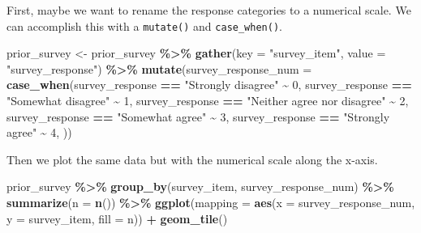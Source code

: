 \documentclass[
]{book}
\newenvironment{Shaded}{\begin{snugshade}}{\end{snugshade}}
\newcommand{\DataTypeTok}[1]{\textcolor[rgb]{0.13,0.29,0.53}{#1}}
\newcommand{\DecValTok}[1]{\textcolor[rgb]{0.00,0.00,0.81}{#1}}
\newcommand{\KeywordTok}[1]{\textcolor[rgb]{0.13,0.29,0.53}{\textbf{#1}}}
\newcommand{\NormalTok}[1]{#1}
\newcommand{\OperatorTok}[1]{\textcolor[rgb]{0.81,0.36,0.00}{\textbf{#1}}}
\newcommand{\StringTok}[1]{\textcolor[rgb]{0.31,0.60,0.02}{#1}}
\begin{document}
First, maybe we want to rename the response categories to a numerical scale. We can accomplish this with a \texttt{mutate()} and \texttt{case\_when()}.

\begin{Shaded}
\begin{Highlighting}[]
\NormalTok{prior\_survey \textless{}{-}}\StringTok{ }\NormalTok{prior\_survey }\OperatorTok{\%\textgreater{}\%}\StringTok{ }
\StringTok{  }\KeywordTok{gather}\NormalTok{(}\DataTypeTok{key =} \StringTok{"survey\_item"}\NormalTok{, }\DataTypeTok{value =} \StringTok{"survey\_response"}\NormalTok{) }\OperatorTok{\%\textgreater{}\%}\StringTok{ }
\StringTok{  }\KeywordTok{mutate}\NormalTok{(}\DataTypeTok{survey\_response\_num =} \KeywordTok{case\_when}\NormalTok{(survey\_response }\OperatorTok{==}\StringTok{ "Strongly disagree"} \OperatorTok{\textasciitilde{}}\StringTok{ }\DecValTok{0}\NormalTok{,}
\NormalTok{                                         survey\_response }\OperatorTok{==}\StringTok{ "Somewhat disagree"} \OperatorTok{\textasciitilde{}}\StringTok{ }\DecValTok{1}\NormalTok{,}
\NormalTok{                                         survey\_response }\OperatorTok{==}\StringTok{ "Neither agree nor disagree"} \OperatorTok{\textasciitilde{}}\StringTok{ }\DecValTok{2}\NormalTok{,}
\NormalTok{                                         survey\_response }\OperatorTok{==}\StringTok{ "Somewhat agree"} \OperatorTok{\textasciitilde{}}\StringTok{ }\DecValTok{3}\NormalTok{,}
\NormalTok{                                         survey\_response }\OperatorTok{==}\StringTok{ "Strongly agree"} \OperatorTok{\textasciitilde{}}\StringTok{ }\DecValTok{4}\NormalTok{,}
\NormalTok{                                         )) }
\end{Highlighting}
\end{Shaded}

Then we plot the same data but with the numerical scale along the x-axis.

\begin{Shaded}
\begin{Highlighting}[]
\NormalTok{prior\_survey }\OperatorTok{\%\textgreater{}\%}\StringTok{ }
\StringTok{  }\KeywordTok{group\_by}\NormalTok{(survey\_item, survey\_response\_num) }\OperatorTok{\%\textgreater{}\%}\StringTok{ }
\StringTok{  }\KeywordTok{summarize}\NormalTok{(}\DataTypeTok{n =} \KeywordTok{n}\NormalTok{()) }\OperatorTok{\%\textgreater{}\%}\StringTok{ }
\StringTok{  }\KeywordTok{ggplot}\NormalTok{(}\DataTypeTok{mapping =} \KeywordTok{aes}\NormalTok{(}\DataTypeTok{x =}\NormalTok{ survey\_response\_num, }\DataTypeTok{y =}\NormalTok{ survey\_item, }\DataTypeTok{fill =}\NormalTok{ n)) }\OperatorTok{+}
\StringTok{  }\KeywordTok{geom\_tile}\NormalTok{()}
\end{Highlighting}
\end{Shaded}
\end{document}
